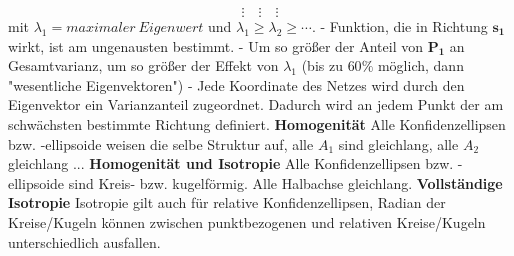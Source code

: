 \documentclass[12pt]{article}
\begin{document}
\begin{equation*}
\vdots \quad \vdots \quad \vdots
\end{equation*}
mit $\lambda_1 = maximaler\ Eigenwert$ und $\lambda_1 \geq \lambda_2 \geq \cdots$. \newline
\newline
- Funktion, die in Richtung $\bm{s_1}$ wirkt, ist am ungenausten bestimmt.\newline
- Um so größer der Anteil von $\bm{P_1}$ an Gesamtvarianz, um so größer der Effekt von $\lambda_1$ (bis zu $60\%$ möglich, dann "wesentliche Eigenvektoren")\newline
- Jede Koordinate des Netzes wird durch den Eigenvektor ein Varianzanteil zugeordnet. Dadurch wird an jedem Punkt der am schwächsten bestimmte Richtung definiert.\newline
\textbf{Homogenität} \newline
Alle Konfidenzellipsen bzw. -ellipsoide weisen die selbe Struktur auf, alle $A_1$ sind gleichlang, alle $A_2$ gleichlang ...\newline
\textbf{Homogenität und Isotropie} \newline
Alle Konfidenzellipsen bzw. -ellipsoide sind Kreis- bzw. kugelförmig. Alle Halbachse gleichlang.\newline
\textbf{Vollständige Isotropie} \newline
Isotropie gilt auch für relative Konfidenzellipsen, Radian der Kreise/Kugeln können zwischen punktbezogenen und relativen Kreise/Kugeln unterschiedlich ausfallen.
\newpage
\end{document}
